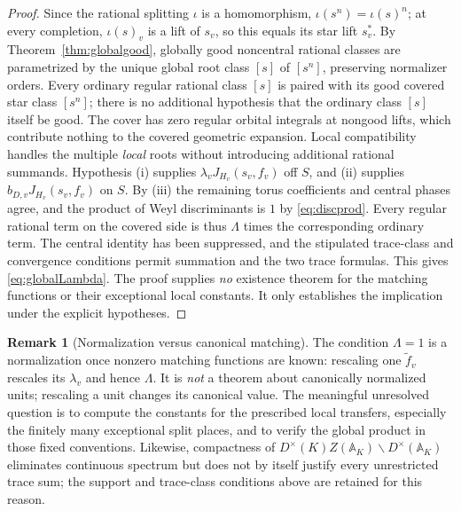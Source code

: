 \documentclass[11pt]{article}
\theoremstyle{plain}
\theoremstyle{definition}
\newtheorem{remark}[theorem]{Remark}
\begin{document}
\begin{proof}
Since the rational splitting $\iota$ is a homomorphism,
$\iota(s^n)=\iota(s)^n$; at every completion, $\iota(s)_v$
is a lift of $s_v$, so this equals its star lift $s_v^*$.
By Theorem~\ref{thm:globalgood}, globally good noncentral
rational classes are parametrized by the unique global root
class $[s]$ of $[s^n]$, preserving normalizer orders.
Every ordinary regular rational class $[s]$ is paired with its good
covered star class $[s^n]$; there is no additional hypothesis
that the ordinary class $[s]$ itself be good.  The cover has zero
regular orbital integrals at nongood lifts, which contribute
nothing to the covered geometric expansion.  Local compatibility
handles the multiple \emph{local} roots without introducing
additional rational summands.  Hypothesis (i) supplies
$\lambda_v J_{H_v}(s_v,f_v)$ off $S$, and (ii) supplies
$b_{D,v}J_{H_v}(s_v,f_v)$ on $S$. By (iii) the remaining torus
coefficients and central phases agree, and the product of Weyl
discriminants is $1$ by \eqref{eq:discprod}.  Every regular
rational term on the covered side is thus $\Lambda$ times the
corresponding ordinary term.  The central identity has been
suppressed, and the stipulated trace-class and convergence
conditions permit summation and the two trace formulas. This
gives \eqref{eq:globalLambda}.  The proof supplies \emph{no}
existence theorem for the matching functions or their exceptional
local constants.  It only establishes the implication under the
explicit hypotheses.
\end{proof}

\begin{remark}[Normalization versus canonical matching]
The condition $\Lambda=1$ is a normalization once nonzero
matching functions are known: rescaling one $\widetilde f_v$
rescales its $\lambda_v$ and hence $\Lambda$. It is \emph{not}
a theorem about canonically normalized units; rescaling a unit
changes its canonical value.  The meaningful unresolved question
is to compute the constants for the prescribed local transfers,
especially the finitely many exceptional split places, and to
verify the global product in those fixed conventions.
Likewise, compactness of $D^\times(K)Z(\mathbb A_K)\backslash
D^\times(\mathbb A_K)$ eliminates continuous spectrum but does
not by itself justify every unrestricted trace sum; the support
and trace-class conditions above are retained for this reason.
\end{remark}
\end{document}
